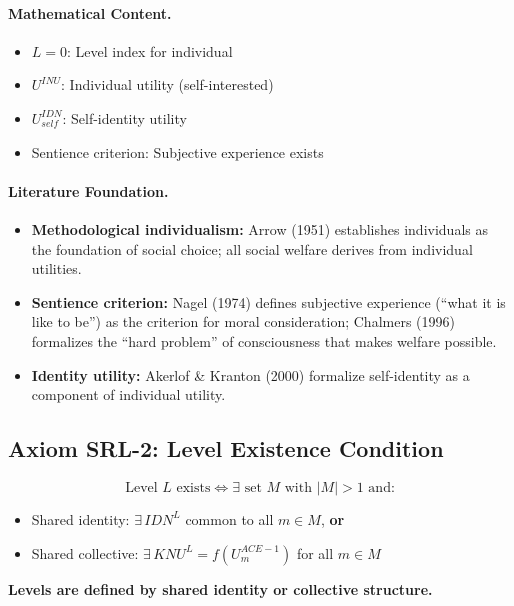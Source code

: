 \paragraph{Mathematical Content.}
\begin{itemize}
\item $L = 0$: Level index for individual
\item $U^{INU}$: Individual utility (self-interested)
\item $U^{IDN}_{self}$: Self-identity utility
\item Sentience criterion: Subjective experience exists
\end{itemize}

\paragraph{Literature Foundation.}
\begin{itemize}
\item \textbf{Methodological individualism:} Arrow (1951) establishes individuals as 
the foundation of social choice; all social welfare derives from individual utilities.
\item \textbf{Sentience criterion:} Nagel (1974) defines subjective experience 
(``what it is like to be'') as the criterion for moral consideration; Chalmers (1996) 
formalizes the ``hard problem'' of consciousness that makes welfare possible.
\item \textbf{Identity utility:} Akerlof \& Kranton (2000) formalize self-identity 
as a component of individual utility.
\end{itemize}

\subsection{Axiom SRL-2: Level Existence Condition}

\begin{tcolorbox}[colback=gray!5!white, colframe=gray!75!black, title=Axiom SRL-2: Level Existence]
\begin{equation}
\boxed{
\text{Level } L \text{ exists} \iff \exists \text{ set } M \text{ with } |M| > 1 \text{ and:}
}
\end{equation}
\begin{itemize}
\item[(a)] Shared identity: $\exists \, IDN^L$ common to all $m \in M$, \textbf{or}
\item[(b)] Shared collective: $\exists \, KNU^L = f(U^{ACE-1}_m)$ for all $m \in M$
\end{itemize}
\textbf{Levels are defined by shared identity or collective structure.}
\end{tcolorbox}

